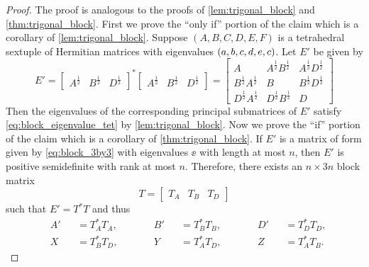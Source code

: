 \documentclass[notitlepage, 10pt]{article}
\begin{document}
\begin{proof}
    The proof is analogous to the proofs of \cref{lem:trigonal_block} and \cref{thm:trigonal_block}.
    First we prove the ``only if'' portion of the claim which is a corollary of \cref{lem:trigonal_block}.
    Suppose $(A,B,C,D,E,F)$ is a tetrahedral sextuple of Hermitian matrices with eigenvalues $(a,b,c,d,e,c)$.
    Let $E'$ be given by
    \begin{equation}
        E' =
        \begin{bmatrix}
            A^{\frac{1}{2}} & B^{\frac{1}{2}} & D^{\frac{1}{2}}
        \end{bmatrix}^{*}
        \begin{bmatrix}
            A^{\frac{1}{2}} & B^{\frac{1}{2}} & D^{\frac{1}{2}}
        \end{bmatrix}
        =
        \begin{bmatrix}
            A & A^{\frac{1}{2}}B^{\frac{1}{2}} & A^{\frac{1}{2}}D^{\frac{1}{2}} \\
            B^{\frac{1}{2}}A^{\frac{1}{2}} & B & B^{\frac{1}{2}}D^{\frac{1}{2}} \\
            D^{\frac{1}{2}}A^{\frac{1}{2}} & D^{\frac{1}{2}}B^{\frac{1}{2}} & D
        \end{bmatrix}
    \end{equation}
    Then the eigenvalues of the corresponding principal submatrices of $E'$ satisfy \cref{eq:block_eigenvalue_tet} by \cref{lem:trigonal_block}.
    Now we prove the ``if'' portion of the claim which is a corollary of \cref{thm:trigonal_block}.
    If $E'$ is a matrix of form given by \cref{eq:block_3by3} with eigenvalues $\ee$ with length at most $n$, then $E'$ is positive semidefinite with rank at most $n$.
    Therefore, there exists an $n\times 3n$ block matrix
    \begin{equation}
        T = \begin{bmatrix} T_{A} & T_{B} & T_{D} \end{bmatrix}
    \end{equation}
    such that $E' = T^{*}T$ and thus
    \begin{equation}
        \begin{alignedat}{6}
            &A' &&= T_{A}^{*}T_{A}, \qquad
            &&B' &&= T_{B}^{*}T_{B}, \qquad
            &&D' &&= T_{D}^{*}T_{D}, \\
            &X &&= T_{B}^{*}T_{D}, \qquad
            &&Y &&= T_{A}^{*}T_{D}, \qquad
            &&Z &&= T_{A}^{*}T_{B}.
        \end{alignedat}

\end{equation}
\end{proof}
\end{document}

